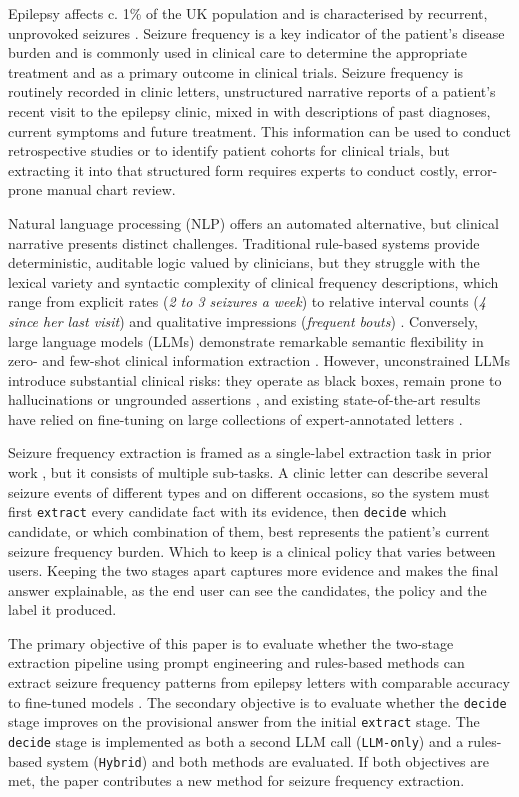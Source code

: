 \documentclass[conference]{IEEEtran}
\begin{document}
Epilepsy affects c. 1\% of the UK population \cite{b1} and is 
characterised by recurrent, unprovoked seizures \cite{b2}. 
Seizure frequency is a key indicator of the patient's disease
burden and is commonly used in clinical care to determine 
the appropriate treatment and as a primary outcome in 
clinical trials. Seizure frequency is routinely recorded in 
clinic letters, unstructured narrative reports of a patient's
recent visit to the epilepsy clinic, mixed in with descriptions 
of past diagnoses, current symptoms 
and future treatment. This information can be used to 
conduct retrospective studies or to identify patient cohorts 
for clinical trials, but extracting it into that structured form 
requires experts to conduct costly, error-prone manual 
chart review. 

Natural language processing (NLP) offers an automated 
alternative, but clinical narrative presents distinct challenges. 
Traditional rule-based systems provide deterministic, 
auditable logic valued by clinicians, but they struggle with the 
lexical variety and syntactic complexity of clinical frequency 
descriptions, which range from explicit rates (\emph{2 to 3 
seizures a week}) to relative interval counts 
(\emph{4 since her last visit}) and qualitative impressions 
(\emph{frequent bouts}) \cite{b3}. Conversely, large language 
models (LLMs) demonstrate remarkable semantic flexibility 
in zero- and few-shot clinical information extraction \cite{b4, b5}. 
However, unconstrained LLMs introduce substantial clinical 
risks: they operate as black boxes, remain prone to 
hallucinations or ungrounded assertions \cite{b6}, and 
existing state-of-the-art results have relied on fine-tuning on 
large collections of expert-annotated letters \cite{b3}.

Seizure frequency extraction is framed as a single-label
extraction task in prior work \cite{b3}, but it consists of
multiple sub-tasks. A clinic letter can describe several 
seizure events of different types and on different 
occasions, so the system must first \texttt{extract} every 
candidate fact with its evidence, then \texttt{decide} which 
candidate, or which combination of them, best represents
the patient's current seizure frequency burden. Which to 
keep is a clinical policy that varies between users. Keeping 
the two stages apart captures more evidence and makes the 
final answer explainable, as the end user can see 
the candidates, the policy and the label it produced. 

The primary objective of this paper is to evaluate whether 
the two-stage extraction pipeline using prompt engineering
and rules-based methods can extract seizure frequency patterns from epilepsy letters 
with comparable accuracy to fine-tuned models \cite{b3}. The secondary 
objective is to evaluate whether the \texttt{decide} stage improves 
on the provisional answer from the initial \texttt{extract} stage. 
The \texttt{decide} stage is implemented as both a second
LLM call (\texttt{LLM-only}) and a rules-based 
system (\texttt{Hybrid}) and both methods are evaluated.
If both objectives are met, the paper contributes 
a new method for seizure frequency extraction.
\end{document}
